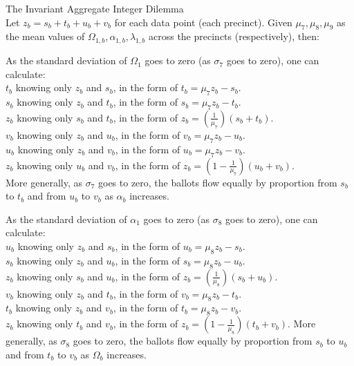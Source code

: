 \newpage
\begin{corollary}{The Invariant Aggregate Integer Dilemma}\\
Let $z_{b}=s_{b}+t_{b}+u_{b}+v_{b}$ for each data point (each precinct).
Given $\mu_{7}, \mu_{8}, \mu_{9}$ as the mean values of $\Omega_{1,b}, \alpha_{1,b}, \lambda_{1,b}$ across the precincts (respectively), then:

As the standard deviation of $\Omega_{1}$ goes to zero (as $\sigma_{7}$ goes to zero), one can calculate:\\
$t_{b}$ knowing only $z_{b}$ and $s_{b}$, in the form of $t_{b}=\mu_{7}z_{b}-s_{b}$.\\
$s_{b}$ knowing only $z_{b}$ and $t_{b}$, in the form of $s_{b}=\mu_{7}z_{b}-t_{b}$.\\
$z_{b}$ knowing only $s_{b}$ and $t_{b}$, in the form of $z_{b}=(\frac{1}{\mu_{7}})(s_{b}+t_{b})$.\\
$v_{b}$ knowing only $z_{b}$ and $u_{b}$, in the form of $v_{b}=\mu_{7}z_{b}-u_{b}$.\\
$u_{b}$ knowing only $z_{b}$ and $v_{b}$, in the form of $u_{b}=\mu_{7}z_{b}-v_{b}$.\\
$z_{b}$ knowing only $u_{b}$ and $v_{b}$, in the form of $z_{b}=(1-\frac{1}{\mu_{7}})(u_{b}+v_{b})$.\\
More generally, as  $\sigma_{7}$ goes to zero, the ballots flow equally by proportion from $s_{b}$ to $t_{b}$ and from $u_{b}$ to $v_{b}$ as $\alpha_{b}$ increases.

As the standard deviation of $\alpha_{1}$ goes to zero (as $\sigma_{8}$ goes to zero), one can calculate:\\
$u_{b}$ knowing only $z_{b}$ and $s_{b}$, in the form of $u_{b}=\mu_{8}z_{b}-s_{b}$.\\
$s_{b}$ knowing only $z_{b}$ and $u_{b}$, in the form of $s_{b}=\mu_{8}z_{b}-u_{b}$.\\
$z_{b}$ knowing only $s_{b}$ and $u_{b}$, in the form of $z_{b}=(\frac{1}{\mu_{8}})(s_{b}+u_{b})$.\\
$v_{b}$ knowing only $z_{b}$ and $t_{b}$, in the form of $v_{b}=\mu_{8}z_{b}-t_{b}$.\\
$t_{b}$ knowing only $z_{b}$ and $v_{b}$, in the form of $t_{b}=\mu_{8}z_{b}-v_{b}$.\\
$z_{b}$ knowing only $t_{b}$ and $v_{b}$, in the form of $z_{b}=(1-\frac{1}{\mu_{8}})(t_{b}+v_{b})$.
More generally, as  $\sigma_{8}$ goes to zero, the ballots flow equally by proportion from $s_{b}$ to $u_{b}$ and from $t_{b}$ to $v_{b}$ as $\Omega_{b}$ increases.


\end{corollary}
